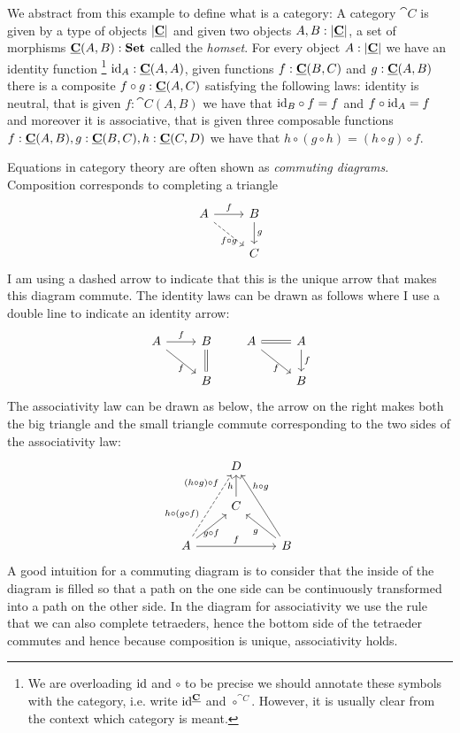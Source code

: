 We abstract from this example to define what is a category: A category $\cat{C}$ is given by a type of objects $|\underline{\mathbf{C}}|$ and given two objects $A,B: |\underline{\mathbf{C}}|$, a set of morphisms $\underline{\mathbf{C}}(A,B) : \mathbf{Set}$ called the \emph{homset}. 
For every object $A : |\underline{\mathbf{C}}|$ we have an identity function%
\footnote{We are overloading $\mathrm{id}$ and $\circ$ to be precise we should annotate these symbols with the category, i.e. write $\mathrm{id}^{\underline{\mathbf{C}}}$ and $\circ^{\cat{C}}$. However, it is usually clear from the context which category is meant.}
$\mathrm{id}_A : \underline{\mathbf{C}}(A,A)$, given functions $f : \underline{\mathbf{C}}(B,C)$ and $g : \underline{\mathbf{C}}(A,B)$ there is a composite $f \circ g : \underline{\mathbf{C}}(A,C)$ satisfying the following laws: identity is neutral, that is given $f : \cat{C}(A,B)$ we have that $\mathrm{id}_B \circ f = f$ and $f \circ \mathrm{id}_A = f$ and moreover it is associative, that is given three composable functions $f : \underline{\mathbf{C}}(A,B), g : \underline{\mathbf{C}}(B,C), h : \underline{\mathbf{C}}(C,D)$ we have that $h \circ (g \circ h) = (h \circ g) \circ f$.

Equations in category theory are often shown as \emph{commuting diagrams}. Composition corresponds to completing a triangle
\[\begin{tikzcd}
A \arrow[rd, dashrightarrow,"f\circ g" below] \arrow[r,"f"] & B \arrow[d,"g"]\\
& C
\end{tikzcd}
\]
I am using a dashed arrow to indicate that this is the unique arrow that makes this diagram commute. 
The identity laws can be drawn as follows where I use a double line to indicate an identity arrow:
\[\begin{tikzcd}
A \arrow[rd,"f" below] \arrow[r,"f"] & B \arrow[d,equal]\\
& B
\end{tikzcd}
\qquad
\begin{tikzcd}
A \arrow[rd,"f" below] \arrow[r,equal] & A \arrow[d,"f"]\\
& B
\end{tikzcd}
\]
The associativity law can be drawn as below, the arrow on the right makes both the big triangle and the small triangle commute corresponding to the two sides of the associativity law:
\[\begin{tikzcd}
    & D  &\\
   & C  \arrow[u,"h"] & \\
A \arrow[ur,"g \circ f" below]\arrow[rr,"f"] 
\arrow[uur,dashrightarrow,"h \circ(g \circ f)" near start,"(h\circ g)\circ f" near end] &     & B \arrow[ul,"g"]\arrow[uul,"h \circ g" above=10]
\end{tikzcd}
\]
A good intuition for a commuting diagram is to consider that the inside of the diagram is filled so that a path on the one side can be continuously transformed into a path on the other side. In the diagram for associativity we use the rule that we can also complete tetraeders, hence the bottom side of the tetraeder commutes and hence because composition is unique, associativity holds.

